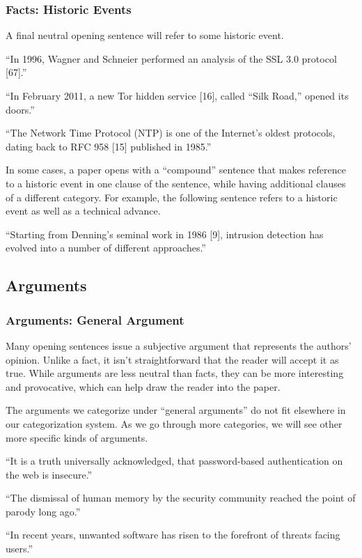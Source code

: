 \documentclass[sigconf]{acmart}
\begin{document}
	\subsubsection{Facts: Historic Events}
	
	A final neutral opening sentence will refer to some historic event. 
	
	``In 1996, Wagner and Schneier performed an analysis of the SSL 3.0 protocol [67].''
	
	``In February 2011, a new Tor hidden service [16], called “Silk Road,” opened its doors.''
	
	``The Network Time Protocol (NTP) is one of the Internet’s oldest protocols, dating back to RFC 958 [15] published in 1985.''
	
	In some cases, a paper opens with a “compound” sentence that makes reference to a historic event in one clause of the sentence, while having additional clauses of a different category. For example, the following sentence refers to a historic event as well as a technical advance.
	
	``Starting from Denning’s seminal work in 1986 [9], intrusion detection has evolved into a number of different approaches.''
	
	\subsection{Arguments}
	\subsubsection{Arguments: General Argument}
	
	Many opening sentences issue a subjective argument that represents the authors’ opinion. Unlike a fact, it isn’t straightforward that the reader will accept it as true. While arguments are less neutral than facts, they can be more interesting and provocative, which can help draw the reader into the paper.
	
	The arguments we categorize under “general arguments” do not fit elsewhere in our categorization system. As we go through more categories, we will see other more specific kinds of arguments. 
	
	``It is a truth universally acknowledged, that password-based authentication on the web is insecure.''
	
	``The dismissal of human memory by the security community reached the point of parody long ago.''
	
	``In recent years, unwanted software has risen to the forefront of threats facing users.''
	
\end{document}
